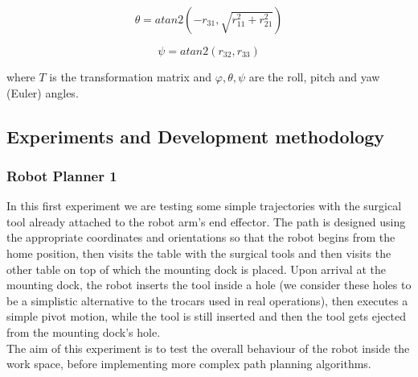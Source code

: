 \[
θ = atan2(-r_{31}, \sqrt{r_{11}^2 + r_{21}^2})
\]

\[
ψ = atan2(r_{32}, r_{33})
\]

where $T$ is the transformation matrix and $φ, θ, ψ$ are the roll, pitch and yaw (Euler) angles.




\subsection{Experiments and Development methodology}

\subsubsection{Robot Planner 1}

In this first experiment we are testing some simple trajectories with the surgical tool already attached to the robot arm's end effector.
The path is designed using the appropriate coordinates and orientations so that the robot begins from the home position, then visits the table with the surgical 
tools and then visits the other table on top of which the mounting dock is placed. Upon arrival at the mounting dock, the robot inserts the tool inside a hole
(we consider these holes to be a simplistic alternative to the trocars used in real operations), then executes a simple pivot motion, while the tool is still 
inserted and then the tool gets ejected from the mounting dock's hole.\\

The aim of this experiment is to test the overall behaviour of the robot inside the work space, before implementing more complex path planning algorithms.

